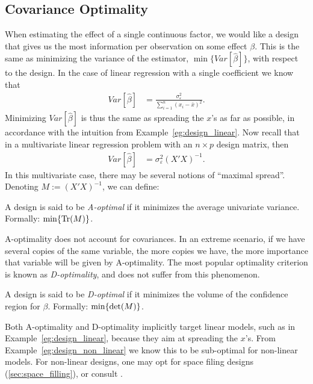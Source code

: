 \subsection{Covariance Optimality}
When estimating the effect of a single continuous factor, we would like a design that gives us the most information per observation on some effect $\beta$. 
This is the same as minimizing the variance of the estimator, $\min \{Var[\hat{\beta}]\}$, with respect to the design.
In the case of linear regression with a single coefficient we know that 
\begin{align}
	Var[\hat{\beta}] &= \frac{\sigma^2_\varepsilon}{\sum_{i=1}^{n}(x_i-\bar{x})^2}.
\end{align}
Minimizing $Var[\hat{\beta}]$ is thus the same as spreading the $x$'s as far as possible, in accordance with the intuition from Example~\ref{eg:design_linear}.
Now recall that in a multivariate linear regression problem with an $n \times p$ design matrix, then 
\begin{align}
	Var[\hat{\beta}] &= \sigma^2_\varepsilon (X'X)^{-1}.
\end{align}
In this multivariate case, there may be several notions of ``maximal spread''. 
Denoting $M:= (X'X)^{-1}$, we can define:
\begin{definition}[A-Optimality]
	A design is said to be \emph{A-optimal} if it minimizes the average univariate variance.
	Formally: $\min \{ \operatorname{Tr}(M) \}$.
\end{definition}
A-optimality does not account for covariances. 
In an extreme scenario, if we have several copies of the same variable, the more copies we have, the more importance that variable will be given by A-optimality.
The most popular optimality criterion is known as \emph{D-optimality}, and does not suffer from this phenomenon.
\begin{definition}[D-Optimality]
	A design is said to be \emph{D-optimal} if it minimizes the volume of the confidence region for $\beta$. 
	Formally: $\min \{ \det(M) \}$.
\end{definition}

Both A-optimality and D-optimality implicitly target linear models, such as in Example~\ref{eg:design_linear}, because they aim at spreading the $x$'s. From Example~\ref{eg:design_non_linear} we know this to be sub-optimal for non-linear models. 
For non-linear designs, one may opt for space filing designs (\ref{sec:space_filling}), or consult \cite{pukelsheim_optimal_1993}. 



